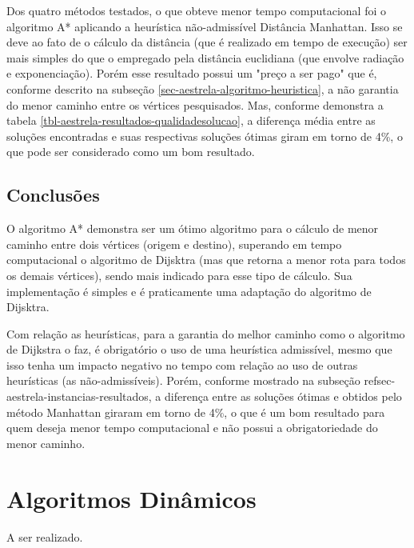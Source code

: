 Dos quatro métodos testados, o que obteve menor tempo computacional foi o algoritmo A* aplicando a heurística não-admissível Distância Manhattan. Isso se deve ao fato de o cálculo da distância (que é realizado em tempo de execução) ser mais simples do que o empregado pela distância euclidiana (que envolve radiação e exponenciação). Porém esse resultado possui um "preço a ser pago" que é, conforme descrito na subseção \ref{sec-aestrela-algoritmo-heuristica}, a não garantia do menor caminho entre os vértices pesquisados. Mas, conforme demonstra a tabela \ref{tbl-aestrela-resultados-qualidadesolucao}, a diferença média entre as soluções encontradas e suas respectivas soluções ótimas giram em torno de 4\%, o que pode ser considerado como um bom resultado.

\subsection{Conclusões}
\label{sec-aestrela-conclusao}
O algoritmo A* demonstra ser um ótimo algoritmo para o cálculo de menor caminho entre dois vértices (origem e destino), superando em tempo computacional o algoritmo de Dijsktra (mas que retorna a menor rota para todos os demais vértices), sendo mais indicado para esse tipo de cálculo. Sua implementação é simples e é praticamente uma adaptação do algoritmo de Dijsktra.

Com relação as heurísticas, para a garantia do melhor caminho como o algoritmo de Dijkstra o faz, é obrigatório o uso de uma heurística admissível, mesmo que isso tenha um impacto negativo no tempo com relação ao uso de outras heurísticas (as não-admissíveis). Porém, conforme mostrado na subseção ref{sec-aestrela-instancias-resultados}, a diferença entre as soluções ótimas e obtidos pelo método Manhattan giraram em torno de 4\%, o que é um bom resultado para quem deseja menor tempo computacional e não possui a obrigatoriedade do menor caminho.

\section{Algoritmos Dinâmicos}
\label{sec-experimentos-dinamicos}

A ser realizado.



